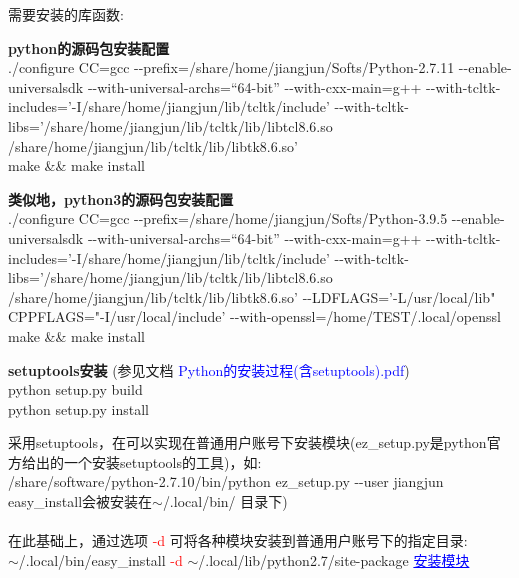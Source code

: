 \documentclass[10pt,a4paper]{article}
\begin{document}
需要安装的库函数:

\textbf{python的源码包安装配置}\\
./configure CC=gcc -\/-prefix=/share/home/jiangjun/Softs/Python-2.7.11  -\/-enable-universalsdk -\/-with-universal-archs=``64-bit''  -\/-with-cxx-main=g++ -\/-with-tcltk-includes='-I/share/home/jiangjun/lib/tcltk/include' -\/-with-tcltk-libs='/share/home/jiangjun/lib/tcltk/lib/libtcl8.6.so /share/home/jiangjun/lib/tcltk/lib/libtk8.6.so'\\
make \&\& make install

\textbf{类似地，python3的源码包安装配置}\\
./configure CC=gcc -\/-prefix=/share/home/jiangjun/Softs/Python-3.9.5  -\/-enable-universalsdk -\/-with-universal-archs=``64-bit''  -\/-with-cxx-main=g++ -\/-with-tcltk-includes='-I/share/home/jiangjun/lib/tcltk/include' -\/-with-tcltk-libs='/share/home/jiangjun/lib/tcltk/lib/libtcl8.6.so /share/home/jiangjun/lib/tcltk/lib/libtk8.6.so' -\/-LDFLAGS='-L/usr/local/lib" CPPFLAGS="-I/usr/local/include' -\/-with-openssl=/home/TEST/.local/openssl \\
make \&\& make install

\textbf{setuptools安装} (参见文档 \textcolor{blue}{\textrm{Python}的安装过程(含\textrm{setuptools}).pdf})\\
python setup.py build\\
python setup.py install


采用\textrm{setuptools}，在可以实现在普通用户账号下安装模块(\textrm{ez\_setup.py}是\textrm{python}官方给出的一个安装\textrm{setuptools}的工具)，如:\\
/share/software/python-2.7.10/bin/python ez\_setup.py -\/-user jiangjun\\
\textrm{easy\_install}会被安装在$\sim$/.local/bin/ 目录下)\\\\

在此基础上，通过选项 \textcolor{red}{-d} 可将各种模块安装到普通用户账号下的指定目录:\\
$\sim$/.local/bin/easy\_install \textcolor{red}{-d} $\sim$/.local/lib/python2.7/site-package \textcolor{blue}{\underline{安装模块}}
\end{document}
